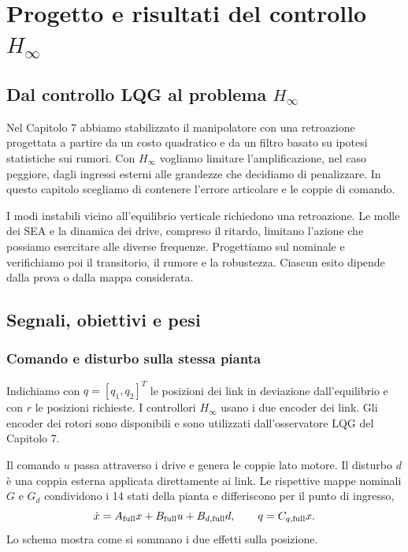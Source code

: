\chapter{\texorpdfstring{Progetto e risultati del controllo $H_\infty$}{Progetto e risultati del controllo H infinity}}
\label{cap:hinf}

\section{Dal controllo LQG al problema \texorpdfstring{$H_\infty$}{H infinity}}

Nel Capitolo 7 abbiamo stabilizzato il manipolatore con una retroazione
progettata a partire da un costo quadratico e da un filtro basato su
ipotesi statistiche sui rumori. Con $H_\infty$ vogliamo limitare
l'amplificazione, nel caso peggiore, dagli ingressi esterni alle
grandezze che decidiamo di penalizzare. In questo capitolo scegliamo
di contenere l'errore articolare e le coppie di comando.

I modi instabili vicino all'equilibrio verticale richiedono una
retroazione. Le molle dei SEA e la dinamica dei drive, compreso il
ritardo, limitano l'azione che possiamo esercitare alle diverse
frequenze. Progettiamo sul nominale e verifichiamo poi il transitorio,
il rumore e la robustezza. Ciascun esito dipende dalla prova o dalla
mappa considerata.

\section{Segnali, obiettivi e pesi}

\subsection{Comando e disturbo sulla stessa pianta}

Indichiamo con $q=[q_1,q_2]^T$ le posizioni dei link in deviazione
dall'equilibrio e con $r$ le posizioni richieste. I controllori
$H_\infty$ usano i due encoder dei link. Gli encoder dei rotori sono
disponibili e sono utilizzati dall'osservatore LQG del Capitolo 7.

Il comando $u$ passa attraverso i drive e genera le coppie lato
motore. Il disturbo $d$ è una coppia esterna applicata direttamente
ai link. Le rispettive mappe nominali $G$ e $G_d$ condividono i
14 stati della pianta e differiscono per il punto di ingresso,
\[
\dot x=A_{\rm full}x+B_{\rm full}u+B_{d,\rm full}d,
\qquad q=C_{q,\rm full}x.
\]
Lo schema mostra come si sommano i due effetti sulla posizione.

